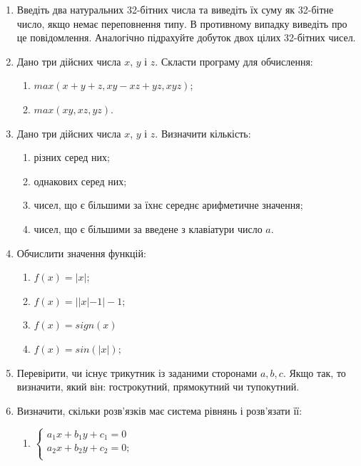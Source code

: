 \documentclass[a5paper,titlepage,openany,twoside,draft]{book_unv}%
\makeatletter
\newcommand{\xslalph}[1]{\expandafter\@xslalph\csname c@#1\endcsname}
\newcommand{\@xslalph}[1]{%
    \ifcase#1\or а\or б\or в\or г\or д\or e\or є\or ж\or з\or i%
    \or й\or к\or л\or м\or н\or о\or п\or р\or с\or т%
    \or у\or ф\or х\or ц\or ч\or ш\or ю\or я\or аа\or бб\or вв%
    \else\@ctrerr\fi%
}
\makeatother
\begin{document}
\begin{enumerate}
\def\labelenumi{\arabic{enumi})}
\setcounter{enumi}{7}
\item
  Введіть два натуральних 32-бітних числа та виведіть їх суму як
  32-бітне число, якщо немає переповнення типу. В противному випадку
  виведіть про це повідомлення. Аналогічно підрахуйте добуток двох цілих
  32-бітних чисел.
\item
  Дано три дійсних числа $x$, $y$ і $z$. Скласти програму для
  обчислення:
\begin{enumerate}[label=\xslalph*)]
\item
  \(max(x + y + z,xy- xz + yz,xyz)\);
\item
  \(max(xy,xz,yz)\).
\end{enumerate}

\item
  Дано три дійсних числа $x$, $y$ і $z$. Визначити кількість:
\begin{enumerate}[label=\xslalph*)]
\item різних серед них; 
\item однакових серед них;
\item чисел, що є більшими за їхнє середнє арифметичне значення;
\item чисел, що є більшими за введене з клавіатури число \(a\).
\end{enumerate}

\item
  Обчислити значення функцій:
\begin{enumerate}[label=\xslalph*)]
\item \(f(x) = |x|;\) \item \(f(x) = ||x| - 1| - 1;\)
\item \(f(x) = sign(x)\) \item \(f(x) = sin(|x|);\)

\end{enumerate}


\item
  Перевірити, чи існує трикутник із заданими сторонами $a,b,c$.
  Якщо так, то визначити, який він: гострокутний, прямокутний чи
  тупокутний.

\item
  Визначити, скільки розв'язків має система рівнянь і розв'язати її:
\begin{enumerate}[label=\xslalph*)]
\item \(\left\{ \begin{matrix}
a_{1}x + b_{1}y + c_{1} = 0 \\
a_{2}x + b_{2}y + c_{2} = 0; \\
\end{matrix} \right.\ \) 


\end{enumerate}
\end{enumerate}
\end{document}
